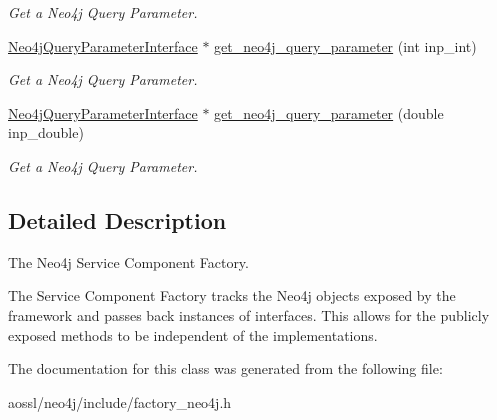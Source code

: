 \begin{DoxyCompactItemize}
\begin{DoxyCompactList}\small\item\em Get a Neo4j Query Parameter. \end{DoxyCompactList}\item 
\hyperlink{classNeo4jQueryParameterInterface}{Neo4j\+Query\+Parameter\+Interface} $\ast$ \hyperlink{classNeo4jComponentFactory_a97ff47a2e296efa377fe4c98825b229b}{get\+\_\+neo4j\+\_\+query\+\_\+parameter} (int inp\+\_\+int)\hypertarget{classNeo4jComponentFactory_a97ff47a2e296efa377fe4c98825b229b}{}\label{classNeo4jComponentFactory_a97ff47a2e296efa377fe4c98825b229b}

\begin{DoxyCompactList}\small\item\em Get a Neo4j Query Parameter. \end{DoxyCompactList}\item 
\hyperlink{classNeo4jQueryParameterInterface}{Neo4j\+Query\+Parameter\+Interface} $\ast$ \hyperlink{classNeo4jComponentFactory_ad325213000220544cd0ee6f8245bac0d}{get\+\_\+neo4j\+\_\+query\+\_\+parameter} (double inp\+\_\+double)\hypertarget{classNeo4jComponentFactory_ad325213000220544cd0ee6f8245bac0d}{}\label{classNeo4jComponentFactory_ad325213000220544cd0ee6f8245bac0d}

\begin{DoxyCompactList}\small\item\em Get a Neo4j Query Parameter. \end{DoxyCompactList}\end{DoxyCompactItemize}


\subsection{Detailed Description}
The Neo4j Service Component Factory. 

The Service Component Factory tracks the Neo4j objects exposed by the framework and passes back instances of interfaces. This allows for the publicly exposed methods to be independent of the implementations. 

The documentation for this class was generated from the following file\+:\begin{DoxyCompactItemize}
\item 
aossl/neo4j/include/factory\+\_\+neo4j.\+h\end{DoxyCompactItemize}
